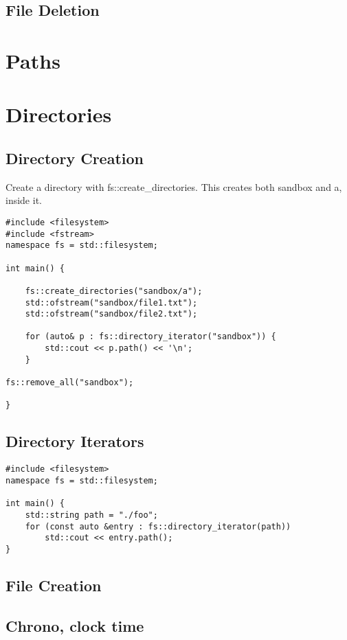 \subsection{File Deletion}

\section{Paths}

\section{Directories}

\subsection{Directory Creation}

Create a directory with fs::create\_directories. This creates both sandbox and a, inside it.

\begin{verbatim}
#include <filesystem>
#include <fstream>
namespace fs = std::filesystem;

int main() {

    fs::create_directories("sandbox/a");
    std::ofstream("sandbox/file1.txt");
    std::ofstream("sandbox/file2.txt");

    for (auto& p : fs::directory_iterator("sandbox")) {
        std::cout << p.path() << '\n';
    } 

fs::remove_all("sandbox");

}
\end{verbatim}

\subsection{Directory Iterators}

\begin{verbatim}
#include <filesystem>
namespace fs = std::filesystem;

int main() {
    std::string path = "./foo";
    for (const auto &entry : fs::directory_iterator(path))
        std::cout << entry.path();
}
\end{verbatim}

\subsection{File Creation}

\subsection{Chrono, clock time}


